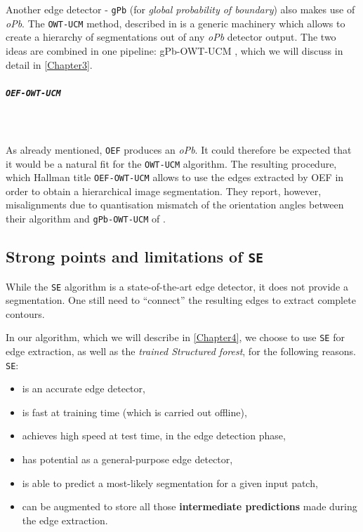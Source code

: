 Another edge detector - {\tt gPb} (for {\it global probability of boundary}) \cite{Maire2008using} also makes use of {\it oPb}. The {\tt OWT-UCM} method, described in \cite{Arbelaez09} is a generic machinery which allows to create a hierarchy of segmentations out of any {\it oPb} detector output. The two ideas are combined in one pipeline: gPb-OWT-UCM \cite{Arbelaez11}, which we will discuss %
in detail in \cref{Chapter3}. 

\subparagraph{{\tt OEF-OWT-UCM}}\mbox{}\\\mbox{}\\
As already mentioned, {\tt OEF} produces an {\it oPb}. It could therefore be expected that it would be a natural fit for the {\tt OWT-UCM} algorithm. The resulting procedure, which Hallman \etal title {\tt OEF-OWT-UCM} allows to use the edges extracted by OEF %
in order to obtain a hierarchical image segmentation. They report, however, misalignments due to quantisation mismatch of the orientation angles between their algorithm and {\tt gPb-OWT-UCM} of \cite{Arbelaez11}.

\subsection{Strong points and limitations of {\tt SE}}
While the {\tt SE} algorithm is a state-of-the-art edge detector, it does not provide a segmentation. One still need to ``connect'' the resulting edges to extract complete contours. %

In our algorithm, which we will describe in \cref{Chapter4}, we choose to use {\tt SE} for edge extraction, as well as %
the {\it trained Structured forest}, for the following reasons. {\tt SE}:
\begin{itemize}
 \item is an accurate edge detector,
 \item is fast at training time (which is carried out %
 offline),
 \item achieves high %
 speed at test time, in the edge detection phase, %
 \item has potential as a general-purpose edge detector, %
 \item is able to predict a most-likely segmentation for a given input patch,
 \item can be augmented to store all those {\bf intermediate predictions} made during the edge extraction.
\end{itemize}

